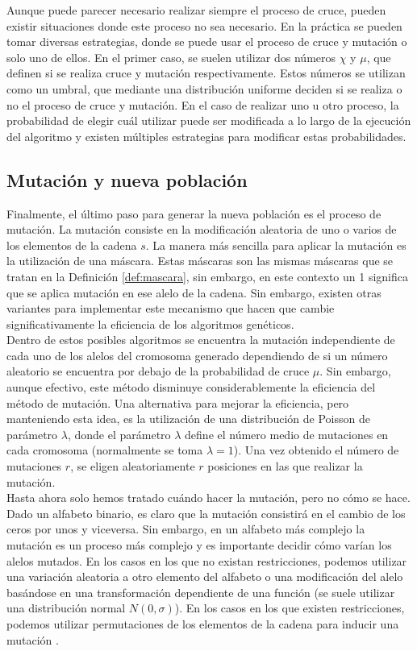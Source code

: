 Aunque puede parecer necesario realizar siempre el proceso de cruce, pueden existir situaciones donde este proceso no sea necesario. En la práctica se pueden tomar diversas estrategias, donde se puede usar el proceso de cruce y mutación o solo uno de ellos. En el primer caso, se suelen utilizar dos números $\chi$ y $\mu$, que definen si se realiza cruce y mutación respectivamente. Estos números se utilizan como un umbral, que mediante una distribución uniforme deciden si se realiza o no el proceso de cruce y mutación. En el caso de realizar uno u otro proceso, la probabilidad de elegir cuál utilizar puede ser modificada a lo largo de la ejecución del algoritmo y existen múltiples estrategias para modificar estas probabilidades.
\subsection{Mutación y nueva población}\label{section:mutacion-genetic}
Finalmente, el último paso para generar la nueva población es el proceso de mutación. La mutación consiste en la modificación aleatoria de uno o varios de los elementos de la cadena $s$. La manera más sencilla para aplicar la mutación es la utilización de una máscara. Estas máscaras son las mismas máscaras que se tratan en la Definición \ref{def:mascara}, sin embargo, en este contexto un 1 significa que se aplica mutación en ese alelo de la cadena. Sin embargo, existen otras variantes para implementar este mecanismo que hacen que cambie significativamente la eficiencia de los algoritmos genéticos.\\

Dentro de estos posibles algoritmos se encuentra la mutación independiente de cada uno de los alelos del cromosoma generado dependiendo de si un número aleatorio se encuentra por debajo de la probabilidad de cruce $\mu$. Sin embargo, aunque efectivo, este método disminuye considerablemente la eficiencia del método de mutación. Una alternativa para mejorar la eficiencia, pero manteniendo esta idea, es la utilización de una distribución de Poisson de parámetro $\lambda$, donde el parámetro $\lambda$ define el número medio de mutaciones en cada cromosoma (normalmente se toma $\lambda=1$). Una vez obtenido el número de mutaciones $r$, se eligen aleatoriamente $r$ posiciones en las que realizar la mutación.\\

Hasta ahora solo hemos tratado cuándo hacer la mutación, pero no cómo se hace. Dado un alfabeto binario, es claro que la mutación consistirá en el cambio de los ceros por unos y viceversa. Sin embargo, en un alfabeto más complejo la mutación es un proceso más complejo y es importante decidir cómo varían los alelos mutados. En los casos en los que no existan restricciones, podemos utilizar una variación aleatoria a otro elemento del alfabeto o una modificación del alelo basándose en una transformación dependiente de una función (se suele utilizar una distribución normal $N(0,\sigma)$). En los casos en los que existen restricciones, podemos utilizar permutaciones de los elementos de la cadena para inducir una mutación \cite{eiben-2003}.\\

